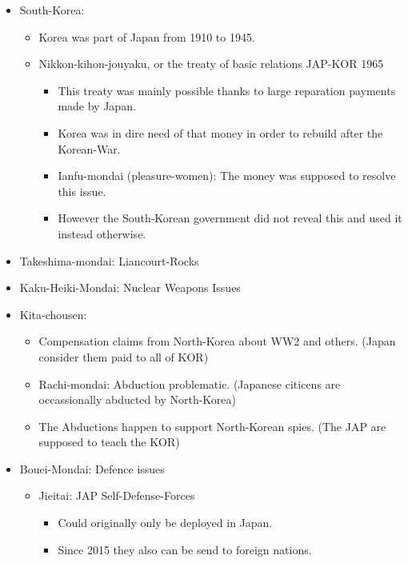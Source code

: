 \documentclass{article}
\begin{document}
\begin{itemize}
\begin{itemize}
          \end{itemize}
     \item South-Korea:
          \begin{itemize}
               \item Korea was part of Japan from 1910 to 1945.
               \item Nikkon-kihon-jouyaku, or the treaty of basic relations JAP-KOR 1965
               \begin{itemize}
                     \item This treaty was mainly possible thanks to large reparation payments made by Japan.
                     \item Korea was in dire need of that money in order to rebuild after the Korean-War.          
                     \item Ianfu-mondai (pleasure-women): The money was supposed to resolve this issue.
                     \item However the South-Korean government did not reveal this and used it instead otherwise.
               \end{itemize}
          \end{itemize}
     \item Takeshima-mondai: Liancourt-Rocks
     \item Kaku-Heiki-Mondai: Nuclear Weapons Issues
     \item Kita-chousen:
          \begin{itemize}
               \item Compensation claims from North-Korea about WW2 and others. (Japan consider them paid to all of KOR) 
               \item Rachi-mondai: Abduction problematic. (Japanese citicens are occassionally abducted by North-Korea)
               \item The Abductions happen to support North-Korean spies. (The JAP are supposed to teach the KOR)
          \end{itemize}
       \item Bouei-Mondai: Defence issues
           \begin{itemize}
               \item Jieitai: JAP Self-Defense-Forces
               \begin{itemize}
                    \item Could originally only be deployed in Japan.
                    \item Since 2015 they also can be send to foreign nations.

\end{itemize}
\end{itemize}
\end{itemize}
\end{document}
